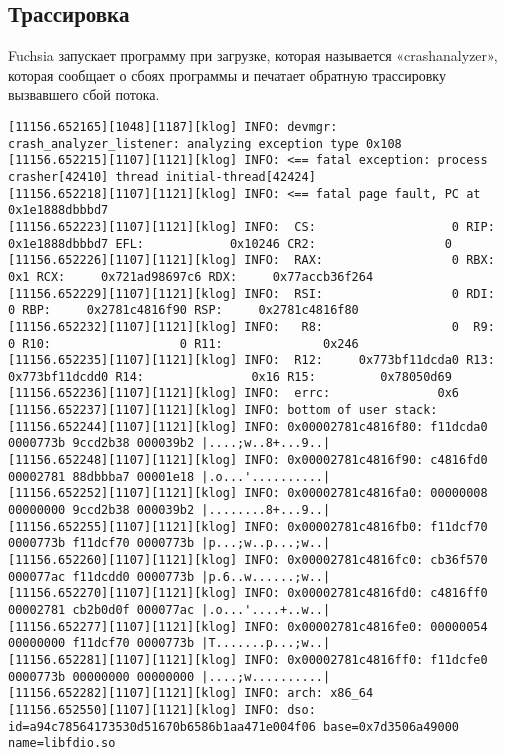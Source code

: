 \documentclass[14pt,a4paper]{article}
\begin{document}
\subsection{Трассировка}
Fuchsia запускает программу при загрузке, которая называется «crashanalyzer», которая сообщает о сбоях программы и печатает обратную трассировку вызвавшего сбой потока.

\begin{lstlisting}
[11156.652165][1048][1187][klog] INFO: devmgr: crash_analyzer_listener: analyzing exception type 0x108
[11156.652215][1107][1121][klog] INFO: <== fatal exception: process crasher[42410] thread initial-thread[42424]
[11156.652218][1107][1121][klog] INFO: <== fatal page fault, PC at 0x1e1888dbbbd7
[11156.652223][1107][1121][klog] INFO:  CS:                   0 RIP:     0x1e1888dbbbd7 EFL:            0x10246 CR2:                  0
[11156.652226][1107][1121][klog] INFO:  RAX:                  0 RBX:                0x1 RCX:     0x721ad98697c6 RDX:     0x77accb36f264
[11156.652229][1107][1121][klog] INFO:  RSI:                  0 RDI:                  0 RBP:     0x2781c4816f90 RSP:     0x2781c4816f80
[11156.652232][1107][1121][klog] INFO:   R8:                  0  R9:                  0 R10:                  0 R11:              0x246
[11156.652235][1107][1121][klog] INFO:  R12:     0x773bf11dcda0 R13:     0x773bf11dcdd0 R14:               0x16 R15:         0x78050d69
[11156.652236][1107][1121][klog] INFO:  errc:               0x6
[11156.652237][1107][1121][klog] INFO: bottom of user stack:
[11156.652244][1107][1121][klog] INFO: 0x00002781c4816f80: f11dcda0 0000773b 9ccd2b38 000039b2 |....;w..8+...9..|
[11156.652248][1107][1121][klog] INFO: 0x00002781c4816f90: c4816fd0 00002781 88dbbba7 00001e18 |.o...'..........|
[11156.652252][1107][1121][klog] INFO: 0x00002781c4816fa0: 00000008 00000000 9ccd2b38 000039b2 |........8+...9..|
[11156.652255][1107][1121][klog] INFO: 0x00002781c4816fb0: f11dcf70 0000773b f11dcf70 0000773b |p...;w..p...;w..|
[11156.652260][1107][1121][klog] INFO: 0x00002781c4816fc0: cb36f570 000077ac f11dcdd0 0000773b |p.6..w......;w..|
[11156.652270][1107][1121][klog] INFO: 0x00002781c4816fd0: c4816ff0 00002781 cb2b0d0f 000077ac |.o...'....+..w..|
[11156.652277][1107][1121][klog] INFO: 0x00002781c4816fe0: 00000054 00000000 f11dcf70 0000773b |T.......p...;w..|
[11156.652281][1107][1121][klog] INFO: 0x00002781c4816ff0: f11dcfe0 0000773b 00000000 00000000 |....;w..........|
[11156.652282][1107][1121][klog] INFO: arch: x86_64
[11156.652550][1107][1121][klog] INFO: dso: id=a94c78564173530d51670b6586b1aa471e004f06 base=0x7d3506a49000 name=libfdio.so

\end{lstlisting}
\end{document}
